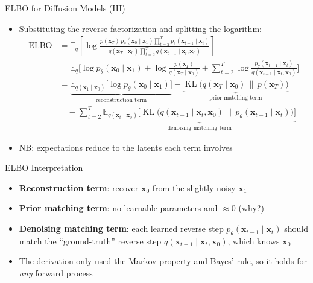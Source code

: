 \documentclass[11pt,compress,t,notes=noshow, xcolor=table]{beamer}
\providecommand{\bx}{\mathbf{x}}
\begin{document}
\begin{frame}{ELBO for Diffusion Models (III)}

\vfill

\begin{itemize}
\item Substituting the reverse factorization and splitting the logarithm:
{\small
\begin{align*}
\operatorname{ELBO}  &= \mathbb{E}_{q}\left[\log \frac{p(\bx_T)\, p_\theta(\bx_0 \mid \bx_1) \prod_{t=2}^{T} p_\theta(\bx_{t-1} \mid \bx_t)}{q(\bx_T \mid \bx_0) \prod_{t=2}^{T} q(\bx_{t-1} \mid \bx_t, \bx_0)}\right]\\[-0.5ex]
&= \mathbb{E}_{q}\bigg[\log p_\theta(\bx_0 \mid \bx_1) + \log \frac{p(\bx_T)}{q(\bx_T \mid \bx_0)} + \sum_{t=2}^{T} \log \frac{p_\theta(\bx_{t-1} \mid \bx_t)}{q(\bx_{t-1} \mid \bx_t, \bx_0)}\bigg]\\
&= \underbrace{\mathbb{E}_{q(\bx_1 \mid \bx_0)}\big[\log p_\theta(\bx_0 \mid \bx_1)\big]}_{\text{reconstruction term}} - \underbrace{\operatorname{KL}\big(q(\bx_T \mid \bx_0) \,\|\, p(\bx_T)\big)}_{\text{prior matching term}}\\[-1ex]
&\quad - \sum_{t=2}^{T} \underbrace{\mathbb{E}_{q(\bx_t \mid \bx_0)}\Big[\operatorname{KL}\big(q(\bx_{t-1} \mid \bx_t, \bx_0) \,\|\, p_\theta(\bx_{t-1} \mid \bx_t)\big)\Big]}_{\text{denoising matching term}}
\end{align*}
}
\item NB: expectations reduce to the latents each term involves
\end{itemize}

\vfill

\end{frame}



\begin{frame}{ELBO Interpretation}
 
\vfill

 
\begin{itemize}
\item \textbf{Reconstruction term}: recover $\bx_0$ from the slightly noisy $\bx_1$
\item \textbf{Prior matching term}: no learnable parameters and $\approx 0$ (why?)
\item \textbf{Denoising matching term}: each learned reverse step $p_\theta(\bx_{t-1} \mid \bx_t)$ should match the ``ground-truth'' reverse step $q(\bx_{t-1} \mid \bx_t, \bx_0)$, which knows $\bx_0$
\item The derivation only used the Markov property and Bayes' rule, so it holds for \emph{any} forward process
\end{itemize}
 
\vfill
 
\end{frame}
\end{document}
